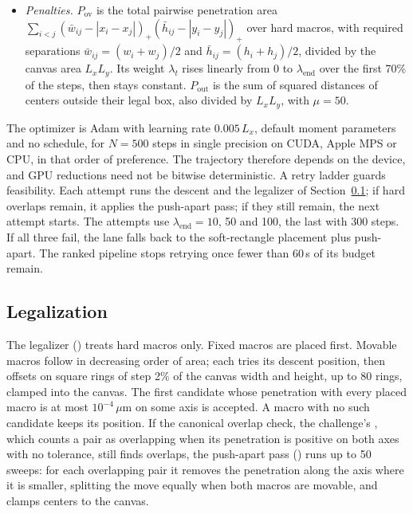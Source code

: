 \begin{itemize}
        as in the evaluator, and added to a macro-blockage map built from clamped
        rectangle--cell overlaps. The score is the mean of the top 5\% of the
        concatenated vertical and horizontal maps. Three simplifications remain:
        three-cell nets are star-routed rather than given L- or T-shapes; stars run
        to every sink pin rather than to distinct cells, with the raw net weight;
        and the evaluator's partial-overlap correction at macro edges is omitted.
  \item \emph{Penalties.} $P_{\mathrm{ov}}$ is the total pairwise penetration area
        $\sum_{i<j}(\bar w_{ij}-|x_i-x_j|)_+(\bar h_{ij}-|y_i-y_j|)_+$ over hard
        macros, with required separations $\bar w_{ij}=(w_i+w_j)/2$ and
        $\bar h_{ij}=(h_i+h_j)/2$, divided by the canvas area $L_xL_y$. Its weight
        $\lambda_t$ rises linearly from 0 to $\lambda_{\mathrm{end}}$ over the first
        70\% of the steps, then stays constant. $P_{\mathrm{out}}$ is the sum of
        squared distances of centers outside their legal box, also divided by
        $L_xL_y$, with $\mu=50$.
\end{itemize}
The optimizer is Adam \citep{kingma2015adam} with learning rate $0.005\,L_x$,
default moment parameters and no schedule, for $N=500$ steps in single precision on
CUDA, Apple MPS or CPU, in that order of preference. The trajectory therefore depends
on the device, and GPU reductions need not be bitwise deterministic. A retry ladder guards feasibility. Each attempt runs the descent and the
legalizer of Section~\ref{app:alg-legal}; if hard overlaps remain, it applies the
push-apart pass; if they still remain, the next attempt starts. The attempts use
$\lambda_{\mathrm{end}}=10$, 50 and 100, the last with 300 steps. If all three fail,
the lane falls back to the soft-rectangle placement plus push-apart. The ranked
pipeline stops retrying once fewer than 60\,s of its budget remain.

\subsection{Legalization}\label{app:alg-legal}

The legalizer () treats hard macros only. Fixed
macros are placed first. Movable macros follow in decreasing order of area; each
tries its descent position, then offsets on square rings of step 2\% of the canvas
width and height, up to 80 rings, clamped into the canvas. The first candidate whose
penetration with every placed macro is at most $10^{-4}\,\mu$m on some axis is
accepted. A macro with no such candidate keeps its position. If the canonical
overlap check, the challenge's , which counts a pair as
overlapping when its penetration is positive on both axes with no tolerance, still
finds overlaps, the push-apart pass ()
runs up to 50 sweeps: for each overlapping pair it removes the penetration along the
axis where it is smaller, splitting the move equally when both macros are movable,
and clamps centers to the canvas.


